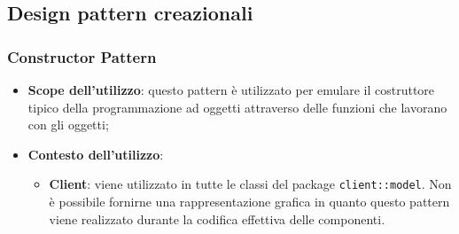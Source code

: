 %


\subsection{Design pattern creazionali} %
\label{sub:design_pattern_creazionali}

	\subsubsection{Constructor Pattern} %
	\label{ssub:constructor_pattern}
		\begin{itemize}
			\item \textbf{Scope dell'utilizzo}: questo pattern è utilizzato per emulare il costruttore tipico della programmazione ad oggetti attraverso delle funzioni che lavorano con gli oggetti;
			\item \textbf{Contesto dell'utilizzo}:
				\begin{itemize}
					\item \textbf{Client}: viene utilizzato in tutte le classi del package \texttt{client::model}. \newline
					Non è possibile fornirne una rappresentazione grafica in quanto questo pattern viene realizzato durante la codifica effettiva delle componenti.
				\end{itemize}
		\end{itemize}

